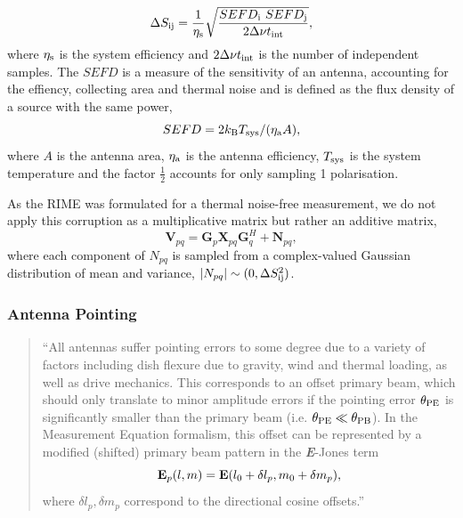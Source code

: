 \begin{equation}
 \Delta S_{\rm ij} = \frac{1}{\eta_{\rm s}}\sqrt{\frac{SEFD_{\rm i}\ SEFD_{\rm j}}{2 \Delta \nu t_{\rm int}}},  
\end{equation}
where $\eta_{\rm s}$ is the system efficiency and $2 \Delta \nu t_{\rm int}$ is the number of independent samples. The $SEFD$ is a measure of the sensitivity of an antenna, accounting for the effiency, collecting area and thermal noise and is defined as the flux density of a source with the same power,
\begin{equation}
 SEFD = 2 k_{\rm B} T_{\rm sys} / (\eta_{\rm a} A),
\end{equation}
where $A$ is the antenna area, $\eta_{\rm a}$ is the antenna efficiency, $T_{\rm sys}$ is the system temperature and the factor $\frac{1}{2}$ accounts for only sampling 1 polarisation.


As the RIME was formulated for a thermal noise-free measurement, we do not apply this corruption as a multiplicative matrix but rather an additive matrix,
\begin{equation}\label{eq:noise_matrix}
\bm{V}_{pq} = \bm G_p \bm{X}_{pq} \bm G_q^H + \bm N_{pq},
\end{equation}
where each component of $N_{pq}$ is sampled from a complex-valued Gaussian distribution of mean and variance, $|N_{pq}| \sim (0, \Delta S_{\rm ij}^2)$.


\subsubsection{Antenna Pointing}\label{sec:point_theory}

\begin{quotation}
``All antennas suffer pointing errors to some degree due to a variety of factors including dish flexure due to gravity, wind and thermal loading, as well as drive mechanics. This corresponds to an offset primary beam, which should only translate to minor amplitude errors if the pointing error $\theta_{\rm PE}$ is significantly smaller than the primary beam (i.e. $\theta_{\rm PE} \ll \theta_{\rm PB}$). In the Measurement Equation formalism, this offset can be represented by a modified (shifted) primary beam pattern in the {\bf \it E}-Jones term \citep[see][]{Smirnov_2011a}
\begin{equation}
{\bf E}_p(l,m) = {\bf E}(l_0 + \delta l_p, m_0 + \delta m_p),
\end{equation}
where $\delta l_p, \delta m_p$ correspond to the directional cosine offsets.''\\
\citep{Blecher_2016}
\end{quotation}

